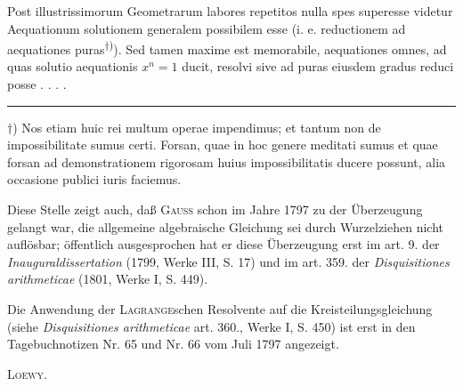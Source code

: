 \indent Post illustrissimorum Geometrarum labores repetitos nulla spes superesse videtur Aequationum solutionem generalem possibilem esse (i. e. reductionem ad aequationes puras\textsuperscript{\(\dagger\))}). Sed tamen maxime est memorabile, aequationes omnes, ad quas solutio aequationis \(x^n=1\) ducit, resolvi sive ad puras eiusdem gradus reduci posse . . . .
\par\smallskip\noindent\rule{.24\linewidth}{.4pt}
\par\indent \(\dagger\)) Nos etiam huic rei multum operae impendimus; et tantum non de impossibilitate sumus certi. Forsan, quae in hoc genere meditati sumus et quae forsan ad demonstrationem rigorosam huius impossibilitatis ducere possunt, alia occasione publici iuris faciemus.

\clearpage{}
\begingroup\small
\indent Diese Stelle zeigt auch, daß \textsc{Gauss} schon im Jahre 1797 zu der Überzeugung gelangt war, die allgemeine algebraische Gleichung sei durch Wurzelziehen nicht auflösbar; öffentlich ausgesprochen hat er diese Überzeugung erst im art. 9. der \textit{Inauguraldissertation} (1799, Werke III, S. 17) und im art. 359. der \textit{Disquisitiones arithmeticae} (1801, Werke I, S. 449).

\indent Die Anwendung der \textsc{Lagrange}schen Resolvente auf die Kreisteilungsgleichung (siehe \textit{Disquisitiones arithmeticae} art. 360., Werke I, S. 450) ist erst in den Tagebuchnotizen Nr. 65 und Nr. 66 vom Juli 1797 angezeigt.
\par\noindent\hfill\textsc{Loewy.}
\par\endgroup
